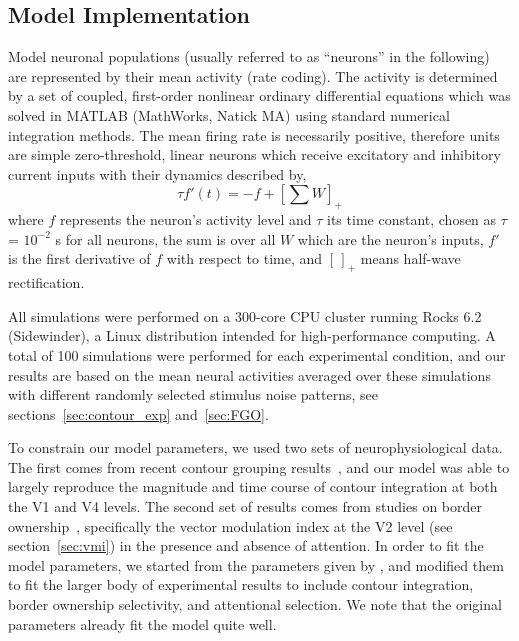 {\subsection{Model Implementation}
\label{sec:implementation}
Model neuronal populations (usually referred to as ``neurons'' in the
following) are represented  by their mean  activity (rate coding). 
The activity is determined by a set of
coupled, first-order nonlinear ordinary differential equations which
was solved in MATLAB (MathWorks, Natick MA) using standard numerical
integration methods. 
The mean firing rate is necessarily positive, therefore units
are simple zero-threshold, linear
neurons which receive excitatory and inhibitory current inputs with
their dynamics described by,
\begin{equation}
\label{eq:1}
\tau f'(t) = -f + \left[ \sum W \right]_{+}
\end{equation}
where $f$ represents the neuron's activity level and $\tau$ its time
constant, chosen as $\tau$ = $10^{-2}$ s for all neurons,
 the sum is over all $W$ which are the neuron's inputs, 
%
$f'$ is the first derivative of $f$ with respect to
time, and $[\,]_{+}$ means half-wave rectification.

All simulations were performed on a 
300-core CPU cluster running Rocks 6.2 (Sidewinder), a Linux
distribution intended for high-performance computing.  A total of 100
simulations were performed for each experimental condition, and our
results are based on the mean neural activities averaged over these
simulations with different randomly selected stimulus noise patterns, see
sections~\ref{sec:contour_exp} and~\ref{sec:FGO}.

To constrain our model parameters, we used two sets of
neurophysiological data. The first comes from recent contour grouping
results~\citep{Chen_etal14}, and our model was able to largely
reproduce the magnitude and time course of contour integration at both
the V1 and V4 levels. The second set of results comes from studies on
border ownership~\citep{Qiu_etal07}, specifically the 
vector
modulation index at the V2 level
(see section~\ref{sec:vmi})
 in the presence and absence of
attention. In order to fit the model parameters, we started from the
parameters given by \cite{Mihalas_etal11b}, and modified them to fit
the larger body of experimental results to include contour
integration, border ownership selectivity, and attentional selection. 
We note that the original parameters already fit the
model quite well.

}
